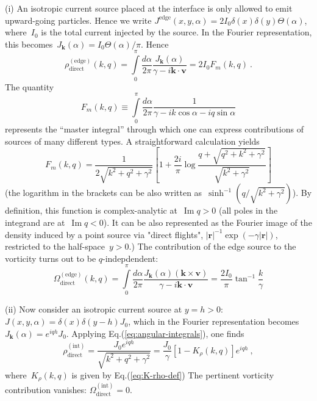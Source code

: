 \documentclass[preprint,aps,eqsecnum]{revtex4-1}
\renewcommand{\Im}{\mathop{\mathrm{Im}}\nolimits}
\newcommand{\dct}[1]{{#1}_\mathrm{direct}}
\begin{document}
(i) An isotropic current source placed at the interface is only allowed
to emit upward-going particles. Hence we  write
$J^{\mathrm{edge}}(x, y, \alpha) = 2 I_0 \delta(x)\delta(y) \Theta(\alpha)$,
where~$I_0$ is the total current injected by the source. In the Fourier
representation, this becomes~$J_{\bm k}(\alpha) = I_0 \Theta(\alpha) / \pi$.
Hence
\begin{equation}
   \label{eq:source-surf-rho}
  \dct{\rho}^{\mathrm{(edge)}}(k, q)
  = \int\limits_{0}^{\pi}
         \frac{d\alpha}{2\pi} \frac{J_{\bm k}(\alpha)}{\gamma
                               - i {\bm k} \cdot {\bm v}} = 2 I_0 F_m(k, q) \ .
\end{equation}
The quantity
\begin{equation}
F_m(k, q) \equiv \int\limits_{0}^{\pi}  \frac{d\alpha}{2\pi}
               \frac{1}{\gamma - i k \cos \alpha - i q \sin\alpha}
\end{equation}
represents the ``master integral'' through which one can express contributions
of sources of many different types. A straightforward calculation yields
\begin{equation}
  \label{eq:source-fm-def}
  F_m(k, q) = \frac{1}{2\sqrt{k^2 + q^2 + \gamma^2}}
  \left[1 + \frac{2i}{\pi}
               \log\frac{q + \sqrt{q^2 + k^2 + \gamma^2}}{\sqrt{k^2 + \gamma^2}}\right]
\end{equation}
(the logarithm in the brackets can be also written
as~$\sinh^{-1} (q / \sqrt{k^2 + \gamma^2})$). By definition, this function
is complex-analytic at~$\Im q > 0$ (all poles in the integrand are
at~$\Im q < 0$). It can be also represented as the
Fourier image of the density induced by a point source via "direct flights",
$|{\bm r}|^{-1} \exp (-\gamma |{\bm r}|)$,
restricted to the half-space~$y > 0$.)
The contribution of the edge  source to the vorticity
turns out to be $q$-indepdendent:
\begin{equation}
  \label{eq:source-surf-omega}
  \dct{\Omega}^{\mathrm{(edge)}}(k, q) =
  \int\limits_{0}^{\pi} \frac{d\alpha}{2\pi} \frac{J_{\bm k}(\alpha)
        ({\bm k} \times {\bm v})}{\gamma - i {\bm k} \cdot {\bm v}}
    = \frac{2 I_0}{\pi} \tan^{-1} \frac{k}{\gamma}
\end{equation}

(ii) Now consider an isotropic current source at $y = h > 0$:
$J(x, y, \alpha) = \delta(x) \delta(y - h) J_0 $,
which in the Fourier representation becomes
$J_{\bm k}(\alpha) = e^{i q h} J_0$.
Applying Eq.(\ref{eq:angular-integrals}), one finds
\begin{equation}
  \label{eq:source-bulk-rho}
  \dct{\rho}^\mathrm{(int)}
  = \frac{J_0 e^{i q h}}{\sqrt{k^2 + q^2 + \gamma^2}}
  = \frac{J_0}{\gamma} \left[1 - K_\rho(k, q) \right]e^{i q h}
  \ ,
\end{equation}
where~$K_\rho(k, q)$ is given by Eq.(\ref{eq:K-rho-def})
The pertinent vorticity contribution vanishes:
$\Omega_\mathrm{direct}^\mathrm{(int)} = 0$.
\end{document}
